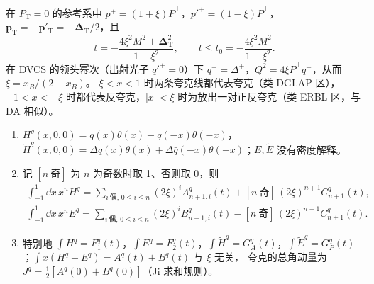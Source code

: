 \begin{proposition}[运动学与支撑区域]\tagR\label{prop:cex-gpd-kin}
在 $\bar P_{\mathrm T}=0$ 的参考系中 $p^+=(1+\xi)\bar P^+$，$p'^+=(1-\xi)\bar P^+$，$\bm p_{\mathrm T}=-\bm p'_{\mathrm T}=-\bm\Delta_{\mathrm T}/2$，且
\begin{equation}\label{eq:cex-t}
t=-\frac{4\xi^2M^2+\bm\Delta_{\mathrm T}^2}{1-\xi^2},\qquad t\le t_0=-\frac{4\xi^2M^2}{1-\xi^2}.
\end{equation}
在 DVCS 的领头幂次（出射光子 $q'^+=0$）下 $q^+=\Delta^+$，$Q^2=4\xi\bar P^+q^-$，从而 $\xi=x_B/(2-x_B)$。
$\xi<x<1$ 时两条夸克线都代表夸克（类 DGLAP 区），$-1<x<-\xi$ 时都代表反夸克，$|x|<\xi$ 时为放出一对正反夸克（类 ERBL 区，与 DA 相似）。
\end{proposition}

\begin{proposition}\tagR\label{prop:cex-poly}
\begin{enumerate}[label=(\alph*)]
\item $H^q(x,0,0)=q(x)\theta(x)-\bar q(-x)\theta(-x)$，$\tilde H^q(x,0,0)=\Delta q(x)\theta(x)+\Delta\bar q(-x)\theta(-x)$；$E,\tilde E$ 没有密度解释。
\item 记 $[n\ \text{奇}]$ 为 $n$ 为奇数时取 1、否则取 0，则
\begin{equation}\label{eq:cex-poly}
\begin{gathered}
\int_{-1}^1\!\dd x\,x^nH^q=\sum_{i\ \text{偶},\,0\le i\le n}(2\xi)^iA^q_{n+1,i}(t)+[n\ \text{奇}]\,(2\xi)^{n+1}C^q_{n+1}(t),\\
\int_{-1}^1\!\dd x\,x^nE^q=\sum_{i\ \text{偶},\,0\le i\le n}(2\xi)^iB^q_{n+1,i}(t)-[n\ \text{奇}]\,(2\xi)^{n+1}C^q_{n+1}(t).
\end{gathered}
\end{equation}
\item 特别地 $\int H^q=F_1^q(t)$，$\int E^q=F^q_2(t)$，$\int\tilde H^q=G^q_A(t)$，$\int\tilde E^q=G^q_P(t)$；$\int x(H^q+E^q)=A^q(t)+B^q(t)$ 与 $\xi$ 无关，
夸克的总角动量为 $J^q=\frac12[A^q(0)+B^q(0)]$（Ji 求和规则）。
\end{enumerate}
\end{proposition}

